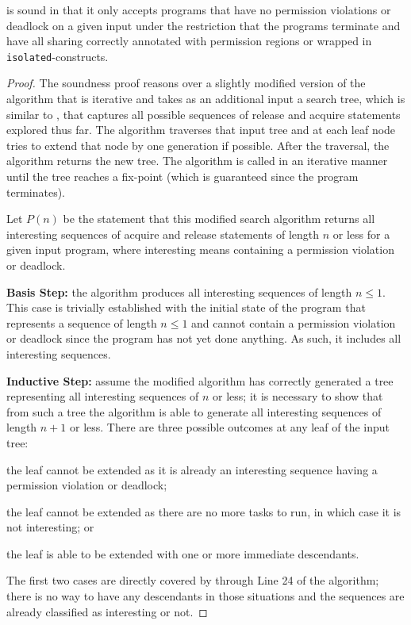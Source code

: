 \begin{theorem}
   is sound in that it only
  accepts programs that have no permission violations or deadlock on a given
  input under the restriction that the programs terminate and have all sharing correctly
  annotated with permission regions or wrapped in
  \texttt{isolated}-constructs.
\end{theorem}
\begin{proof}
The soundness proof reasons over a slightly modified version of the
algorithm that is iterative and takes as an additional input
a search tree, which is similar to , that
captures all possible sequences of release and acquire statements
explored thus far. The algorithm traverses that input tree and at each
leaf node tries to extend that node by one generation if
possible. After the traversal, the algorithm returns the new tree. The
algorithm is called in an iterative manner until the tree reaches a
fix-point (which is guaranteed since the program terminates).

Let $P(n)$ be the statement that this modified search algorithm
returns all interesting sequences of acquire and release statements of
length $n$ or less for a given input program, where interesting means
containing a permission violation or deadlock.

\noindent\textbf{Basis Step:} the algorithm produces all interesting
sequences of length $n \leq 1$. This case is trivially established with
the initial state of the program that represents a sequence of length
$n \leq 1$ and cannot contain a permission violation or deadlock since the program has not yet
done anything. As such, it includes all interesting sequences.

\noindent\textbf{Inductive Step:} assume the modified algorithm has
correctly generated a tree representing all interesting sequences of $n$ or less;
it is necessary to show that from such a tree the algorithm is able to generate all
interesting sequences of length $n+1$ or less.  There are three possible outcomes at any
leaf of the input tree:
\begin{compactenum}
\item the leaf cannot be extended as it is already an interesting sequence having a permission violation or deadlock;
\item the leaf cannot be extended as there are no more tasks to run, in which case it is not interesting; or
\item the leaf is able to be extended with one or more immediate descendants.
\end{compactenum}
The first two cases are directly covered by  through Line 24 of the
algorithm; there is no way to have any descendants in those
situations and the sequences are already classified as interesting or not.


\end{proof}
